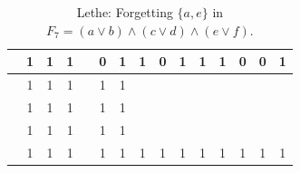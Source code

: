 \begin{table}[!tb]
\begin{tabular}{|c|c|c|c|c|c|c|c|c|c|c|c|c|c|c|}
        \rowcolor{yellow!40}  & 1 & 1 & 1 &  & 0 & 1 & 1 & 0 & 1 & 1 & 1 & 0 & 0 & 1 \\ \hline
        \rowcolor{gray!40}  & 1 & 1 & 1 &  & 1 & 1 &  &  &  &  &  &  &  &  \\ \hline
        \rowcolor{gray!40}  & 1 & 1 & 1 &  & 1 & 1 &  &  &  &  &  &  &  &  \\ \hline
        \rowcolor{gray!40}  & 1 & 1 & 1 &  & 1 & 1 &  &  &  &  &  &  &  &  \\ \hline
        \rowcolor{gray!40}  & 1 & 1 & 1 &  & 1 & 1 & 1 & 1 & 1 & 1 & 1 & 1 & 1 & 1 \\ \hline
    \end{tabular}
    \caption{Lethe: Forgetting $\{a, e\}$ in $F_{7} = (a \lor b) \land (c \lor d) \land (e \lor f)$.}
    \label{tab:lethe-F7-ae}
\end{table}
